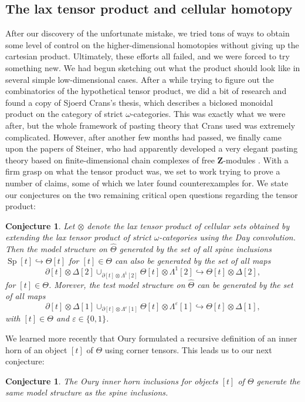 \documentclass[a4paper,9pt]{amsart}
\theoremstyle{plain}   %
\newtheorem{conj}[thm]{Conjecture}
\theoremstyle{remark}
\theoremstyle{plain}
\newcommand{\Sp}{{\operatorname{Sp}}}
\newcommand{\cellset}{\ensuremath{\widehat{\Theta}}}
\begin{document}
\subsection{The lax tensor product and cellular homotopy}
After our discovery of the unfortunate mistake, we tried tons of ways to obtain some level of control on the higher-dimensional homotopies without giving up the cartesian product.  Ultimately, these efforts all failed, and we were forced to try something new.  We had begun sketching out what the product should look like in several simple low-dimensional cases.  After a while trying to figure out the combinatorics of the hypothetical tensor product, we did a bit of research and found a copy of Sjoerd Crans's thesis, which describes a biclosed monoidal product on the category of strict \(\omega\)-categories.  This was exactly what we were after, but the whole framework of pasting theory that Crans used was extremely complicated.  However, after another few months had passed, we finally came upon the papers of Steiner, who had apparently developed a very elegant pasting theory based on finite-dimensional chain complexes of free \(\mathbf{Z}\)-modules \cite{steiner-2004}.   With a firm grasp on what the tensor product was, we set to work trying to prove a number of claims, some of which we later found counterexamples for.  We state our conjectures on the two remaining critical open questions regarding the tensor product:  
\begin{conj} Let \(\otimes\) denote the lax tensor product of cellular sets obtained by extending the lax tensor product of strict \(\omega\)-categories using the Day convolution.  Then the model structure on \(\cellset\) generated by the set of all spine inclusions \(\Sp[t] \hookrightarrow \Theta[t]\) for \([t]\in \Theta\) can also be generated by the set of all maps \[\partial[t] \otimes \Delta[2] \cup_{\partial[t] \otimes \Lambda^1[2]} \Theta[t] \otimes \Lambda^1[2] \hookrightarrow \Theta[t] \otimes \Delta[2],\] for \([t]\in \Theta\).
Morever, the test model structure on \(\cellset\) can be generated by the set of all maps  \[\partial[t] \otimes \Delta[1] \cup_{\partial[t] \otimes \Lambda^\varepsilon[1]} \Theta[t] \otimes \Lambda^\varepsilon[1] \hookrightarrow \Theta[t] \otimes \Delta[1],\] with \([t]\in \Theta\) and \(\varepsilon \in \{0,1\}\).  
\end{conj}

We learned more recently that Oury \cite{ourythesis} formulated a recursive definition of an inner horn of an object \([t]\) of \(\Theta\) using corner tensors. This leads us to our next conjecture: 
\begin{conj}  The Oury inner horn inclusions for objects \([t]\) of \(\Theta\) generate the same model structure as the spine inclusions. 
\end{conj} 
\end{document}
